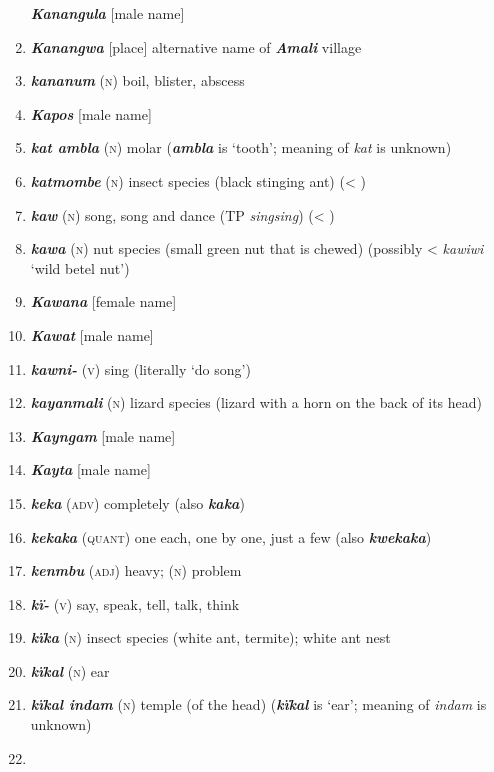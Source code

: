 \begin{enumerate}[noitemsep, label={}, align=left, widest=190, labelsep=1ex,leftmargin=*,itemindent=-10pt]
\textbf{\textit{Kanangula}} [male name] \item 
\textbf{\textit{Kanangwa}} [place] alternative name of \textbf{\textit{Amali}} village \item 
\textbf{\textit{kananum}} (\textsc{n}) boil, blister, abscess \item 
\textbf{\textit{Kapos}} [male name] \item 
\textbf{\textit{kat ambla}} (\textsc{n}) molar (\textbf{\textit{ambla}} is ‘tooth’; meaning of \textit{kat} is unknown) \item 
\textbf{\textit{katmombe}} (\textsc{n}) insect species (black stinging ant) (< ) \item 
\textbf{\textit{kaw}} (\textsc{n}) song, song and dance (TP \textit{singsing}) (< ) \item 
\textbf{\textit{kawa}} (\textsc{n}) nut species (small green nut that is chewed) (possibly <  \textit{kawiwi} ‘wild betel nut’) \item 
\textbf{\textit{Kawana}} [female name] \item 
\textbf{\textit{Kawat}} [male name] \item 
\textbf{\textit{kawni-}} (\textsc{v}) sing (literally ‘do song’) \item 
\textbf{\textit{kayanmali}} (\textsc{n}) lizard species (lizard with a horn on the back of its head) \item 
\textbf{\textit{Kayngam}} [male name] \item 
\textbf{\textit{Kayta}} [male name] \item 
\textbf{\textit{keka}} (\textsc{adv}) completely (also \textbf{\textit{kaka}}) \item 
\textbf{\textit{kekaka}} (\textsc{quant}) one each, one by one, just a few (also \textbf{\textit{kwekaka}}) \item 
\textbf{\textit{kenmbu}} (\textsc{adj}) heavy; (\textsc{n}) problem \item 
\textbf{\textit{kï-}} (\textsc{v}) say, speak, tell, talk, think \item 
\textbf{\textit{kïka}} (\textsc{n}) insect species (white ant, termite); white ant nest \item 
\textbf{\textit{kïkal}} (\textsc{n}) ear \item 
\textbf{\textit{kïkal indam}} (\textsc{n}) temple (of the head) (\textbf{\textit{kïkal}} is ‘ear’; meaning of \textit{indam} is \linebreak unknown) \item 

\end{enumerate}
